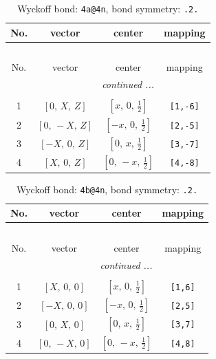 \documentclass[fleqn,8pt]{jsarticle}
\begin{document}
\begin{longtable}{cccc}
\caption{Wyckoff bond: {\tt 4a@4n}, bond symmetry: {\tt .2.}}
 \\
 \hline \hline
No. & vector & center & mapping \\ \hline \endfirsthead

\multicolumn{3}{l}{\tablename\ \thetable{}} \\
 \hline \hline
No. & vector & center & mapping \\ \hline \endhead

 \hline \hline
\multicolumn{3}{r}{\footnotesize\it continued ...} \\ \endfoot

 \hline \hline
\multicolumn{3}{r}{} \\ \endlastfoot

1 & $\left[ 0,\, X,\, Z \right]$ & $\left[ x,\, 0,\, \frac{1}{2} \right]$ & {\tt [1,-6]} \\ \hline
2 & $\left[ 0,\, - X,\, Z \right]$ & $\left[ - x,\, 0,\, \frac{1}{2} \right]$ & {\tt [2,-5]} \\ \hline
3 & $\left[ - X,\, 0,\, Z \right]$ & $\left[ 0,\, x,\, \frac{1}{2} \right]$ & {\tt [3,-7]} \\ \hline
4 & $\left[ X,\, 0,\, Z \right]$ & $\left[ 0,\, - x,\, \frac{1}{2} \right]$ & {\tt [4,-8]} \\
\end{longtable}
\renewcommand{\arraystretch}{1.2}
\begin{longtable}{cccc}
\caption{Wyckoff bond: {\tt 4b@4n}, bond symmetry: {\tt .2.}}
 \\
 \hline \hline
No. & vector & center & mapping \\ \hline \endfirsthead

\multicolumn{3}{l}{\tablename\ \thetable{}} \\
 \hline \hline
No. & vector & center & mapping \\ \hline \endhead

 \hline \hline
\multicolumn{3}{r}{\footnotesize\it continued ...} \\ \endfoot

 \hline \hline
\multicolumn{3}{r}{} \\ \endlastfoot

1 & $\left[ X,\, 0,\, 0 \right]$ & $\left[ x,\, 0,\, \frac{1}{2} \right]$ & {\tt [1,6]} \\ \hline
2 & $\left[ - X,\, 0,\, 0 \right]$ & $\left[ - x,\, 0,\, \frac{1}{2} \right]$ & {\tt [2,5]} \\ \hline
3 & $\left[ 0,\, X,\, 0 \right]$ & $\left[ 0,\, x,\, \frac{1}{2} \right]$ & {\tt [3,7]} \\ \hline
4 & $\left[ 0,\, - X,\, 0 \right]$ & $\left[ 0,\, - x,\, \frac{1}{2} \right]$ & {\tt [4,8]} \\
\end{longtable}
\end{document}
